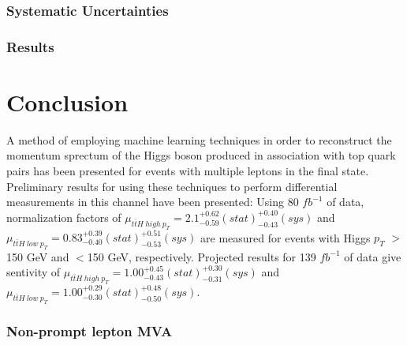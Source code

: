\documentclass[12pt]{report}	%
\theoremstyle{definition}
\theoremstyle{remark}
\begin{document}

\section{Systematic Uncertainties}
\label{sec:sys}


                                                                
\section{Results}
\label{sec:results}



\part{Conclusion}
\label{part:conclusion}

A method of employing machine learning techniques in order to reconstruct the momentum sprectum of the Higgs boson produced in association with top quark pairs has been presented for events with multiple leptons in the final state. Preliminary results for using these techniques to perform differential measurements in this channel have been presented: Using 80 $fb^{-1}$ of data, normalization factors of $\mu_{t\bar{t}H\ high\ p_T} = 2.1^{+0.62}_{-0.59}(stat)^{+0.40}_{-0.43}(sys)$ and $\mu_{t\bar{t}H\ low\ p_T} = 0.83^{+0.39}_{-0.40}(stat)^{+0.51}_{-0.53}(sys)$ are measured for events with Higgs $p_T$ $>$150 GeV and $<$150 GeV, respectively. Projected results for 139 $fb^{-1}$ of data give sentivity of $\mu_{t\bar{t}H\ high\ p_T} = 1.00^{+0.45}_{-0.43}(stat)^{+0.30}_{-0.31}(sys)$ and $\mu_{t\bar{t}H\ low\ p_T} = 1.00^{+0.29}_{-0.30}(stat)^{+0.48}_{-0.50}(sys)$.


%
%
\appendices
{}%

\section{Non-prompt lepton MVA}
\label{sec:lepMVA}

\end{document}
